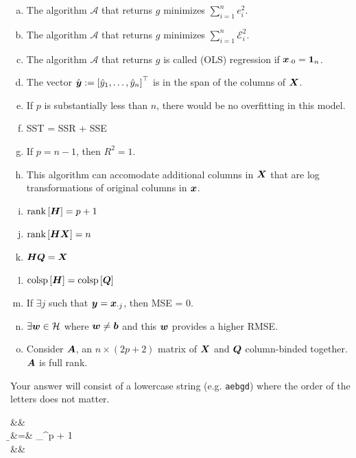 \documentclass[12pt,landscape]{article}
\newcommand{\instr}{\small Your answer will consist of a lowercase string (e.g. \texttt{aebgd}) where the order of the letters does not matter. \normalsize}
\begin{document}
\begin{enumerate}[(a)]
\item The algorithm $\mathcal{A}$ that returns $g$ minimizes $\sum_{i=1}^n e_i^2$.
\item The algorithm $\mathcal{A}$ that returns $g$ minimizes $\sum_{i=1}^n \mathcal{E}_i^2$.
\item The algorithm $\mathcal{A}$ that returns $g$ is called  (OLS) regression if $\boldsymbol{x}_{\cdot 0} = \boldsymbol{1}_n$.
\item The vector $\hat{\boldsymbol{y}} := \left[\hat{y}_1, \ldots, \hat{y}_n\right]^\top$ is in the span of the columns of $\boldsymbol{X}$.
\item If $p$ is substantially less than $n$, there would be no overfitting in this model.
\item SST = SSR + SSE
\item If $p=n-1$, then $R^2 = 1$.
\item This algorithm can accomodate additional columns in $\boldsymbol{X}$ that are log transformations of original columns in $\boldsymbol{x}$.
\item $\text{rank}\left[\boldsymbol{H}\right] = p+1$
\item $\text{rank}\left[\boldsymbol{H}\boldsymbol{X}\right] = n$
\item $\boldsymbol{H}\boldsymbol{Q} = \boldsymbol{X}$
\item $\text{colsp}\left[\boldsymbol{H}\right] = \text{colsp}\left[\boldsymbol{Q}\right]$
\item If $\exists j$ such that $\boldsymbol{y} = \boldsymbol{x}_{\cdot j}$, then MSE = 0.
\item $\exists \boldsymbol{w} \in \mathcal{H}$ where $\boldsymbol{w} \neq \boldsymbol{b}$ and this $\boldsymbol{w}$ provides a higher RMSE.
\item Consider $\boldsymbol{A}$, an $n \times (2p+2)$ matrix of $\boldsymbol{X}$ and $\boldsymbol{Q}$ column-binded together. $\boldsymbol{A}$ is full rank.
\end{enumerate}
\eenum\instr\pagebreak


\problem{} 

\beqn
 &\ingray{=}&  \\
\b &=& \displaystyle\argmin_{\w \in \reals^{p + 1}} \\
 &\ingray{=}& 
\eeqn
\end{document}
